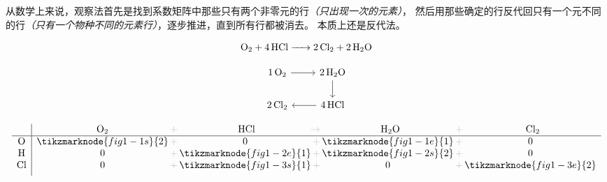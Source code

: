 \documentclass{ctexart}
\newcommand{\grayplus}{\,\color{lightgray}+\,}
\newcommand{\grayto}{\,\color{lightgray}\to\,}
\newcommand{\arrowLR}[3]{%
    \draw[->|,red,thick]
    ([xshift=2pt]#1.south east)
    .. controls ++(0.3cm,-0.2cm) and ++(-0.3cm,-0.2cm) ..
    ([xshift=-2pt]#2.south west)
    node[midway,below,blue,font=\small] {#3};
}
\newcommand{\arrowRL}[3]{%
    \draw[->|,red,thick]
    ([xshift=-2pt]#1.south west)
    .. controls ++(-0.3cm,-0.2cm) and ++(0.3cm,-0.2cm) ..
    ([xshift=2pt]#2.south east)
    node[midway,below,blue,font=\small] {#3};
}
\begin{document}
从数学上来说，观察法首先是找到系数矩阵中那些只有两个非零元的行\textit{（只出现一次的元素）}，
然后用那些确定的行反代回只有一个元不同的行\textit{（只有一个物种不同的元素行）}，逐步推进，直到所有行都被消去。
本质上还是反代法。
{%
    \setlength{\arraycolsep}{8pt}
    \renewcommand\arraystretch{1.5}
    \begin{center}
        \noindent
        \begin{minipage}[c]{0.4\textwidth}
            \[
                \ce{O2 + 4 HCl -> 2 Cl2 + 2 H2O}
            \]

            \[
                \begin{tikzcd}
                    \ce{1O2} \arrow[r] & \ce{2H2O} \arrow[d] \\
                    \ce{2Cl2} & \ce{4HCl} \arrow[l]
                \end{tikzcd}
            \]
        \end{minipage}%
        \hspace{0.01\textwidth}
        \begin{minipage}[c]{0.4\textwidth}
            \[
                \begin{array}{c|*{3}{c@{\grayplus}}c}
                    & \multicolumn{1}{c@{\grayplus}}{\ce{O2}} &
                    \multicolumn{1}{c@{\grayto}}{\ce{HCl}} &
                    \multicolumn{1}{c@{\grayplus}}{\ce{H2O}} &
                    \multicolumn{1}{c}{\ce{Cl2}} \\
                    \hline
                    \ce{O} & \tikzmarknode{fig1-1s}{2} & 0 &
                    \tikzmarknode{fig1-1e}{1} & 0\\
                    \ce{H} & 0 & \tikzmarknode{fig1-2e}{1} &
                    \tikzmarknode{fig1-2s}{2} & 0\\
                    \ce{Cl} & 0 & \tikzmarknode{fig1-3s}{1} & 0 &
                    \tikzmarknode{fig1-3e}{2}\\[1ex]
                \end{array}
            \]
        \end{minipage}
    \end{center}

}
\end{document}

